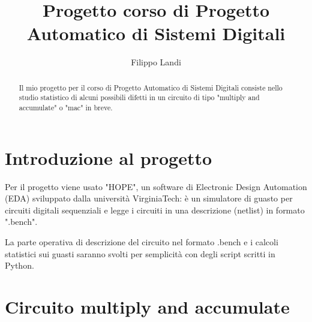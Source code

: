 \documentclass[12pt, letterpaper]{article}
\title{Progetto corso di Progetto Automatico di Sistemi Digitali}
\author{Filippo Landi}
\begin{document}
\maketitle

\begin{abstract}
Il mio progetto per il corso di Progetto Automatico di Sistemi Digitali consiste nello studio statistico di alcuni possibili difetti in un circuito di tipo "multiply and accumulate" o "mac" in breve.
\end{abstract}

\section{Introduzione al progetto}

Per il progetto viene usato "HOPE", un software di Electronic Design Automation (EDA) sviluppato dalla università VirginiaTech: è un simulatore di guasto per circuiti digitali sequenziali e legge i circuiti in una descrizione (netlist) in formato ".bench".

La parte operativa di descrizione del circuito nel formato .bench e i calcoli statistici sui guasti saranno svolti per semplicità con degli script scritti in Python.  

\section{Circuito multiply and accumulate}
\end{document}
